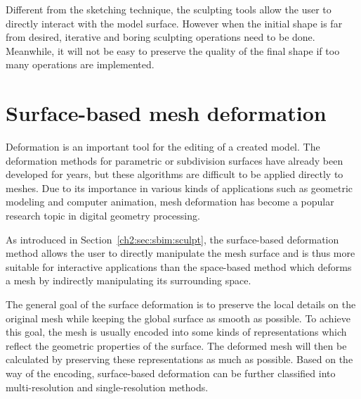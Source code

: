Different from the sketching technique, the sculpting tools  allow
the user to directly interact with the model surface. However when
the initial shape is far from desired, iterative and boring
sculpting operations need to be done. Meanwhile, it will not be easy
to preserve the quality of the final shape if too many operations
are implemented.














\section{Surface-based mesh deformation}\label{ch2:sec:deformation}

Deformation is an important tool for the editing of a created model.
The deformation methods for parametric or subdivision surfaces have
already been developed for years, but these algorithms are difficult
to be applied directly to meshes. Due to its importance in various
kinds of applications such as geometric modeling and computer
animation, mesh deformation has become a popular research topic in
digital geometry processing.

As introduced in Section~\ref{ch2:sec:sbim:sculpt},  the
surface-based deformation method allows the user to directly
manipulate the mesh surface and is thus more suitable for
interactive applications than the space-based method which deforms a
mesh by indirectly manipulating its surrounding space.

The general goal of the surface deformation is to preserve the
local details on the original mesh while keeping the global surface
as smooth as possible. To achieve this goal, the mesh is usually
encoded into some kinds of representations which reflect the
geometric properties of the surface. The deformed mesh will then be
calculated by preserving these representations as much as possible.
Based on the way of the encoding, surface-based deformation can be
further classified into multi-resolution and single-resolution
methods.

